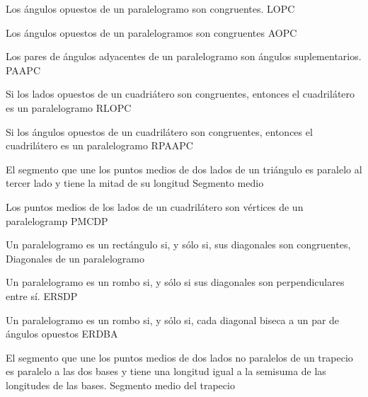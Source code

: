 \begin{teorema}{
Los \'angulos opuestos de un paralelogramo son congruentes.
}{LOPC}

\end{teorema}
\begin{teorema}{
Los \'angulos opuestos de un paralelogramos son congruentes
}{AOPC}

\end{teorema}

\begin{teorema}{
Los pares de \'angulos adyacentes de un paralelogramo son \'angulos
suplementarios.
}{PAAPC}

\end{teorema}
\begin{teorema}{
Si los lados opuestos de un cuadri\'atero son congruentes, entonces el
cuadril\'atero es un paralelogramo
}{RLOPC}

\end{teorema}

\begin{teorema}{
Si los \'angulos opuestos de un cuadril\'atero son congruentes, entonces el
cuadril\'atero es un paralelogramo
}{RPAAPC}
\end{teorema}
\begin{teorema}{
El segmento que une los puntos medios de dos lados de un tri\'angulo es
paralelo al tercer lado y tiene la mitad de su longitud
}{Segmento medio}
\end{teorema}

\begin{teorema}{
Los puntos medios de los lados de un cuadril\'atero son v\'ertices de un
paralelogramp
}{PMCDP}

\end{teorema}
\begin{teorema}{
Un paralelogramo es un rect\'angulo si, y s\'olo si, sus diagonales son
congruentes,
}{Diagonales de un paralelogramo}

\end{teorema}
\begin{teorema}{
Un paralelogramo es un rombo si, y s\'olo si sus diagonales son perpendiculares
entre s\'i.
}{ERSDP}
\end{teorema}

\begin{teorema}{
Un paralelogramo es un rombo si, y s\'olo si, cada diagonal biseca a un par de
\'angulos opuestos
}{ERDBA}

\end{teorema}
\begin{teorema}{
El segmento que une los puntos medios de dos lados no paralelos de un trapecio
es paralelo a las dos bases y tiene una longitud igual a la semisuma de las
longitudes de las bases.
}{Segmento medio del trapecio}

\end{teorema}

